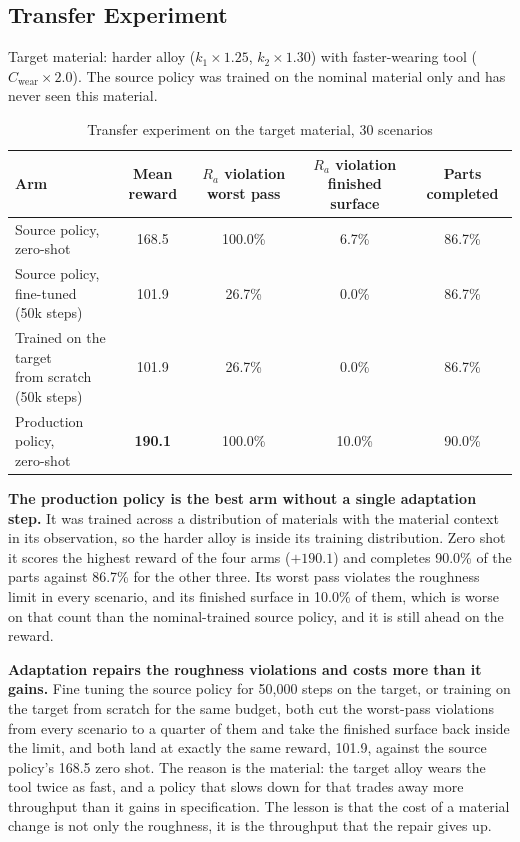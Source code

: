 \documentclass[11pt,a4paper]{article}
\newcommand{\alert}[1]{\textcolor{IITGold}{\textbf{#1}}}
\newcommand{\Ra}{R_a}
\begin{document}
\subsection{Transfer Experiment}

Target material: harder alloy ($k_1 \times 1.25$, $k_2 \times 1.30$) with faster-wearing tool ($C_\text{wear} \times 2.0$). The source policy was trained on the nominal material only and has never seen this material.

\begin{table}[H]
\centering
\caption{Transfer experiment on the target material, 30 scenarios}
\label{tab:transfer}
\small
\setlength{\tabcolsep}{4pt}
\begin{tabular}{@{}lcccc@{}}
\toprule
\textbf{Arm} & \textbf{Mean reward} & \makecell{\textbf{$\Ra$ violation}\\\textbf{worst pass}} & \makecell{\textbf{$\Ra$ violation}\\\textbf{finished surface}} & \textbf{Parts completed} \\
\midrule
\makecell[l]{Source policy,\\zero-shot} & 168.5 & 100.0\% & 6.7\% & 86.7\% \\
\makecell[l]{Source policy,\\fine-tuned (50k steps)} & 101.9 & 26.7\% & 0.0\% & 86.7\% \\
\makecell[l]{Trained on the target\\from scratch (50k steps)} & 101.9 & 26.7\% & 0.0\% & 86.7\% \\
\makecell[l]{Production policy,\\zero-shot} & \alert{190.1} & 100.0\% & 10.0\% & 90.0\% \\
\bottomrule
\end{tabular}
\end{table}

\textbf{The production policy is the best arm without a single adaptation step.} It was trained across a distribution of materials with the material context in its observation, so the harder alloy is inside its training distribution. Zero shot it scores the highest reward of the four arms ($+190.1$) and completes 90.0\% of the parts against 86.7\% for the other three. Its worst pass violates the roughness limit in every scenario, and its finished surface in 10.0\% of them, which is worse on that count than the nominal-trained source policy, and it is still ahead on the reward.

\textbf{Adaptation repairs the roughness violations and costs more than it gains.} Fine tuning the source policy for 50,000 steps on the target, or training on the target from scratch for the same budget, both cut the worst-pass violations from every scenario to a quarter of them and take the finished surface back inside the limit, and both land at exactly the same reward, 101.9, against the source policy's 168.5 zero shot. The reason is the material: the target alloy wears the tool twice as fast, and a policy that slows down for that trades away more throughput than it gains in specification. The lesson is that the cost of a material change is not only the roughness, it is the throughput that the repair gives up.
\end{document}
